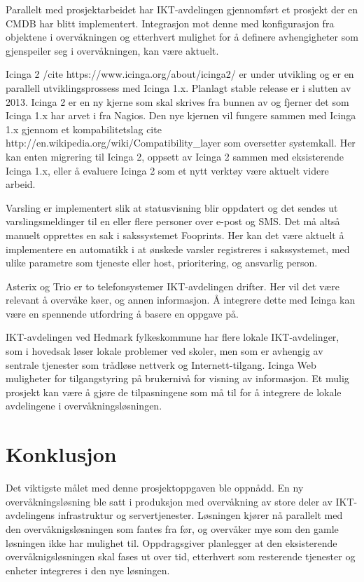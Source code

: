 Parallelt med prosjektarbeidet har IKT-avdelingen gjennomført et prosjekt der en CMDB har blitt implementert. Integrasjon mot denne med konfigurasjon fra objektene i overvåkningen og etterhvert mulighet for å definere avhengigheter som gjenspeiler seg i overvåkningen, kan være aktuelt.

Icinga 2 /cite https://www.icinga.org/about/icinga2/ er under utvikling og er en parallell utviklingsprossess med Icinga 1.x. Planlagt stable release er i slutten av 2013. Icinga 2 er en ny kjerne som skal skrives fra bunnen av og fjerner det som Icinga 1.x har arvet i fra Nagios. Den nye kjernen vil fungere sammen med Icinga 1.x gjennom et kompabilitetslag cite http://en.wikipedia.org/wiki/Compatibility\_layer som oversetter systemkall. Her kan enten migrering til Icinga 2, oppsett av Icinga 2 sammen med eksisterende Icinga 1.x, eller å evaluere Icinga 2 som et nytt verktøy være aktuelt videre arbeid. 

Varsling er implementert slik at statusvisning blir oppdatert og det sendes ut varslingsmeldinger til en eller flere personer over e-post og SMS. Det må altså manuelt opprettes en sak i sakssystemet Fooprints. Her kan det være aktuelt å implementere en automatikk i at ønskede varsler registreres i sakssystemet, med ulike parametre som tjeneste eller host, prioritering, og ansvarlig person.

Asterix og Trio er to telefonsystemer IKT-avdelingen drifter. Her vil det være relevant å overvåke køer, og annen informasjon. Å integrere dette med Icinga kan være en spennende utfordring å basere en oppgave på.

IKT-avdelingen ved Hedmark fylkeskommune har flere lokale IKT-avdelinger, som i hovedsak løser lokale problemer ved skoler, men som er avhengig av sentrale tjenester som trådløse nettverk og Internett-tilgang. Icinga Web muligheter for tilgangstyring på brukernivå for visning av informasjon. Et mulig prosjekt kan være å gjøre de tilpasningene som må til for å integrere de lokale avdelingene i overvåkningsløsningen. 

\section{Konklusjon}
Det viktigste målet med denne prosjektoppgaven ble oppnådd. En ny overvåkningsløsning ble satt i produksjon med overvåkning av store deler av IKT-avdelingens infrastruktur og servertjenester. Løsningen kjører nå parallelt med den overvåknigsløsningen som fantes fra før, og overvåker mye som den gamle løsningen ikke har mulighet til. Oppdragsgiver planlegger at den eksisterende overvåknigsløsningen skal fases ut over tid, etterhvert som resterende tjenester og enheter integreres i den nye løsningen. 

